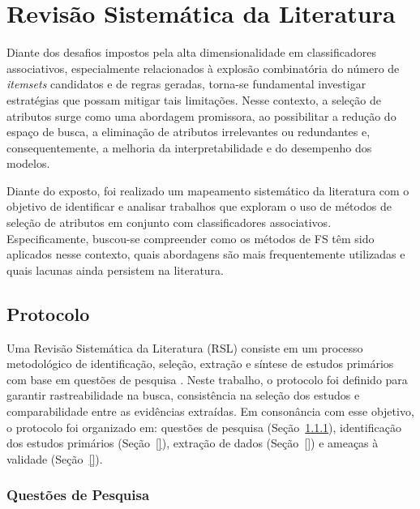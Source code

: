 \chapter{Revisão Sistemática da Literatura}\label{trabRelac}

Diante dos desafios impostos pela alta dimensionalidade em classificadores associativos, especialmente relacionados à explosão combinatória do número de \textit{itemsets} candidatos e de regras geradas, torna-se fundamental investigar estratégias que possam mitigar tais limitações. Nesse contexto, a seleção de atributos surge como uma abordagem promissora, ao possibilitar a redução do espaço de busca, a eliminação de atributos irrelevantes ou redundantes e, consequentemente, a melhoria da interpretabilidade e do desempenho dos modelos.

Diante do exposto, foi realizado um mapeamento sistemático da literatura com o objetivo de identificar e analisar trabalhos que exploram o uso de métodos de seleção de atributos em conjunto com classificadores associativos. Especificamente, buscou-se compreender como os métodos de FS têm sido aplicados nesse contexto, quais abordagens são mais frequentemente utilizadas e quais lacunas ainda persistem na literatura.

\section{Protocolo}\label{sec:protocolo_rsl}

Uma Revisão Sistemática da Literatura (RSL) consiste em um processo metodológico de identificação, seleção, extração e síntese de estudos primários com base em questões de pesquisa \cite{kitchenham2007guidelines,dermeval2020mapeamento}. Neste trabalho, o protocolo foi definido para garantir rastreabilidade na busca, consistência na seleção dos estudos e comparabilidade entre as evidências extraídas. Em consonância com esse objetivo, o protocolo foi organizado em: questões de pesquisa (Seção~\ref{sec:RQs_TR}), identificação dos estudos primários (Seção~\ref{}), extração de dados (Seção~\ref{}) e ameaças à validade (Seção~\ref{}).

\subsection{Questões de Pesquisa}\label{sec:RQs_TR}

